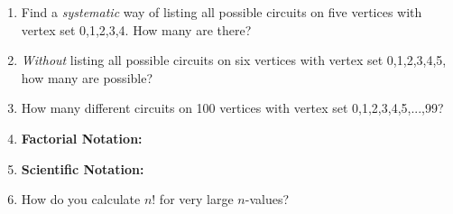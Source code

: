 \documentclass[12pt]{article}
\begin{document}
\begin{enumerate}
\item Find a \emph{systematic} way of listing all possible circuits on five vertices with vertex set 0,1,2,3,4. How many are there?\\
\vfill

\item \emph{Without} listing all possible circuits on six vertices with vertex set 0,1,2,3,4,5, how many are possible?\\
\vspace{.5in}

\item How many different circuits on 100 vertices with vertex set 0,1,2,3,4,5,...,99?\\
\vspace{.25in}
 \newpage
 \item \textbf{Factorial Notation:}
 \vfill
 
 \item \textbf{Scientific Notation:}
 \vfill
 
 \item How do you calculate $n!$ for very large $n$-values?
 
 \vfill
\end{enumerate}
\end{document}
